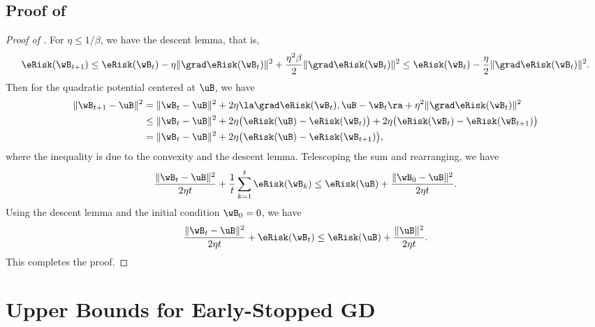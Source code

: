 \documentclass[11pt]{article}
\begin{document}
\subsection{Proof of \texorpdfstring{}{Lemma 3.3}}\label{sec:proof:implicit-regularization}

\begin{proof}[Proof of ]
For $\eta\le 1/\beta$, we have the descent lemma, that is,
\begin{align*}
    \eRisk(\wB_{t+1}) 
    \le \eRisk (\wB_t) - \eta \|\grad \eRisk (\wB_t)\|^2+ \frac{\eta^2 \beta}{2} \|\grad \eRisk (\wB_t)\|^2 
    \le \eRisk (\wB_t) - \frac{\eta}{2} \|\grad \eRisk (\wB_t)\|^2.
\end{align*}
Then for the quadratic potential centered at $\uB$, we have 
\begin{align*}
    \|\wB_{t+1}-\uB\|^2 
    &= \|\wB_{t}-\uB\|^2 + 2\eta \la\grad \eRisk (\wB_t), \uB - \wB_t \ra + \eta^2 \|\grad \eRisk(\wB_t)\|^2  \\
    &\le \|\wB_{t}-\uB\|^2 + 2\eta \big(\eRisk(\uB) - \eRisk (\wB_t)\big) + 2\eta \big( \eRisk (\wB_t)-\eRisk (\wB_{t+1})\big)  \\
    &=  \|\wB_{t}-\uB\|^2 + 2\eta \big(\eRisk(\uB) - \eRisk (\wB_{t+1})\big),
\end{align*}
where the inequality is due to the convexity and the descent lemma.
Telescoping the sum and rearranging, we have 
\begin{align*}
    \frac{\|\wB_t - \uB\|^2}{2\eta t} + \frac{1}{t}\sum_{k=1}^{t}\eRisk(\wB_k) \le \eRisk(\uB) + \frac{\|\wB_0 - \uB\|^2}{2\eta t}.
\end{align*}
Using the descent lemma and the initial condition $\wB_0=0$, we have 
\begin{align*}
    \frac{\|\wB_t - \uB\|^2}{2\eta t} + \eRisk(\wB_t) \le \eRisk(\uB) + \frac{\|\uB\|^2}{2\eta t}.
\end{align*}
This completes the proof.
\end{proof}

\section{Upper Bounds for Early-Stopped GD}
\end{document}
